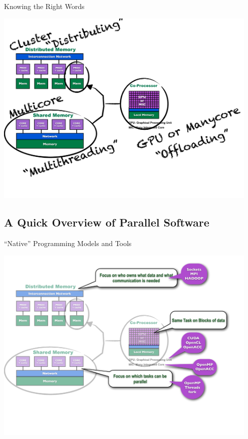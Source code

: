 \begin{frame}
\begin{block}{Knowing the Right Words}
    
\includegraphics[width=0.95\textwidth]
{../common/pics/hardware/ParallelHardware5.pdf}
\end{block}
\end{frame}

\subsection{A Quick Overview of Parallel Software}

\begin{frame}
\begin{block}{``Native'' Programming Models and Tools}
    
\includegraphics[width=0.95\textwidth]
{../common/pics/hardware/ParallelHardware6.pdf}
\end{block}
\end{frame}

